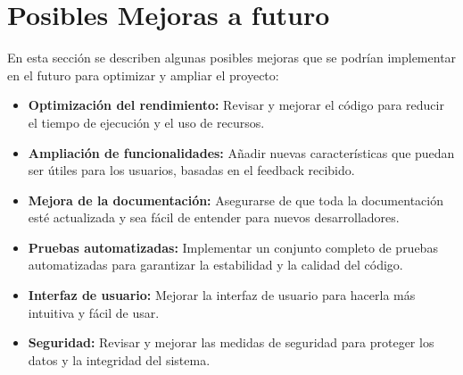 \section{Posibles Mejoras a futuro}
En esta sección se describen algunas posibles mejoras que se podrían implementar en el futuro para optimizar y ampliar el proyecto:

\begin{itemize}
    \item \textbf{Optimización del rendimiento:} Revisar y mejorar el código para reducir el tiempo de ejecución y el uso de recursos.
    \item \textbf{Ampliación de funcionalidades:} Añadir nuevas características que puedan ser útiles para los usuarios, basadas en el feedback recibido.
    \item \textbf{Mejora de la documentación:} Asegurarse de que toda la documentación esté actualizada y sea fácil de entender para nuevos desarrolladores.
    \item \textbf{Pruebas automatizadas:} Implementar un conjunto completo de pruebas automatizadas para garantizar la estabilidad y la calidad del código.
    \item \textbf{Interfaz de usuario:} Mejorar la interfaz de usuario para hacerla más intuitiva y fácil de usar.
    \item \textbf{Seguridad:} Revisar y mejorar las medidas de seguridad para proteger los datos y la integridad del sistema.
\end{itemize}